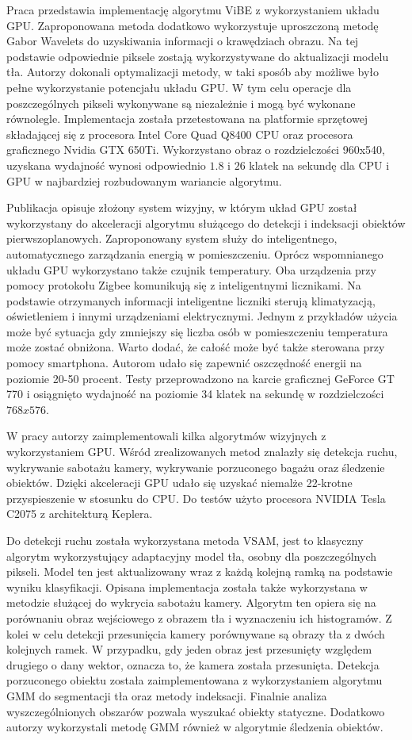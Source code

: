 \documentclass[b5paper,10pt,twoside]{article}
\begin{document}
{ 
Praca \cite{Qin_2015} przedstawia implementację algorytmu ViBE z wykorzystaniem układu GPU.
Zaproponowana metoda dodatkowo wykorzystuje uproszczoną metodę Gabor Wavelets do uzyskiwania informacji o krawędziach obrazu. Na tej podstawie odpowiednie piksele zostają wykorzystywane do aktualizacji modelu tła. 
Autorzy dokonali optymalizacji metody, w taki sposób aby możliwe było pełne wykorzystanie potencjału układu GPU. W tym celu operacje dla poszczególnych pikseli wykonywane są niezależnie i mogą być wykonane równolegle. 
Implementacja została przetestowana na platformie sprzętowej składającej się z procesora Intel Core Quad Q8400 CPU oraz procesora graficznego Nvidia GTX 650Ti. Wykorzystano obraz o rozdzielczości 960x540, uzyskana wydajność wynosi odpowiednio $1.8$ i $26$ klatek na sekundę dla CPU i GPU w najbardziej rozbudowanym wariancie algorytmu.


Publikacja \cite{Song_2016} opisuje złożony system wizyjny, w którym układ GPU został wykorzystany do akceleracji algorytmu służącego do detekcji i indeksacji obiektów pierwszoplanowych. 
Zaproponowany system służy do inteligentnego, automatycznego zarządzania energią w pomieszczeniu. 
Oprócz wspomnianego układu GPU wykorzystano także czujnik temperatury. 
Oba urządzenia przy pomocy protokołu Zigbee komunikują się z inteligentnymi licznikami. 
Na podstawie otrzymanych informacji inteligentne liczniki sterują klimatyzacją, oświetleniem i innymi urządzeniami elektrycznymi. 
Jednym z przykładów użycia może być sytuacja gdy zmniejszy się liczba osób w pomieszczeniu temperatura może zostać obniżona. 
Warto dodać, że całość może być także sterowana przy pomocy smartphona. Autorom udało się zapewnić oszczędność energii na poziomie 20-50 procent. Testy przeprowadzono na karcie graficznej GeForce GT 770 i osiągnięto wydajność na poziomie 34 klatek na sekundę w rozdzielczości $768x576$.


W pracy \cite{Guler_2016} autorzy zaimplementowali kilka algorytmów wizyjnych z wykorzystaniem GPU. 
Wśród zrealizowanych metod znalazły się detekcja ruchu, wykrywanie sabotażu kamery, wykrywanie porzuconego bagażu oraz śledzenie obiektów. Dzięki akceleracji GPU udało się uzyskać niemalże 22-krotne przyspieszenie w stosunku do CPU. Do testów użyto procesora NVIDIA Tesla C2075 z architekturą Keplera. 

Do detekcji ruchu została wykorzystana metoda VSAM, jest to klasyczny algorytm wykorzystujący adaptacyjny model  tła, osobny dla poszczególnych pikseli. Model ten jest aktualizowany wraz z każdą kolejną ramką na podstawie wyniku klasyfikacji. Opisana implementacja została także wykorzystana w metodzie służącej do wykrycia sabotażu kamery. Algorytm ten opiera się na porównaniu obraz wejściowego z obrazem tła i wyznaczeniu ich histogramów. Z kolei w celu detekcji przesunięcia kamery porównywane są obrazy tła z dwóch kolejnych ramek. W przypadku, gdy jeden obraz jest przesunięty względem drugiego o dany wektor, oznacza to, że kamera została przesunięta. Detekcja porzuconego obiektu została zaimplementowana z wykorzystaniem algorytmu GMM do segmentacji tła oraz metody indeksacji. Finalnie analiza wyszczególnionych obszarów pozwala wyszukać obiekty statyczne. Dodatkowo autorzy wykorzystali metodę GMM również w algorytmie śledzenia obiektów.


}
\end{document}
